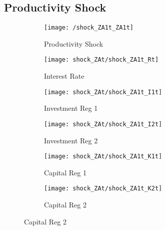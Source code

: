 \documentclass[../thesis.tex]{subfiles}
\begin{document}

\newpage

\subsection{Productivity Shock}

\begin{figure}[h!]
	\centering
	
	
	\begin{subfigure}[b]{0.3\textwidth}
		\centering
		\texttt{[image: /shock\_ZA1t\_ZA1t]}
		\caption{\footnotesize Productivity Shock}
		\label{fig:shock_ZA1t_ZA1t}
	\end{subfigure}
	\hfill
	\begin{subfigure}[b]{0.3\textwidth}
		\centering
		\texttt{[image: shock\_ZAt/shock\_ZA1t\_Rt]}
		\caption{\footnotesize Interest Rate}
		\label{fig:shock_ZA1t_Rt}
	\end{subfigure}
	\hfill
	\begin{subfigure}[b]{0.3\textwidth}
		\centering
		\texttt{[image: shock\_ZAt/shock\_ZA1t\_I1t]}
		\caption{\footnotesize Investment Reg 1}
		\label{fig:shock_ZA1t_I1t}
	\end{subfigure}
	\hfill
	\vspace*{0.5cm}
	
	
	\begin{subfigure}[b]{0.3\textwidth}
		\centering
		\texttt{[image: shock\_ZAt/shock\_ZA1t\_I2t]}
		\caption{\footnotesize Investment Reg 2}
		\label{fig:shock_ZA1t_I2t}
	\end{subfigure}
	\hfill
	\begin{subfigure}[b]{0.3\textwidth}
		\centering
		\texttt{[image: shock\_ZAt/shock\_ZA1t\_K1t]}
		\caption{\footnotesize Capital Reg 1}
		\label{fig:shock_ZA1t_K1t}
	\end{subfigure}
	\hfill
	\begin{subfigure}[b]{0.3\textwidth}
		\centering
		\texttt{[image: shock\_ZAt/shock\_ZA1t\_K2t]}
		\caption{\footnotesize Capital Reg 2}
		\label{fig:shock_ZA1t_K2t}
	\end{subfigure}
	\hfill
	\vspace*{0.5cm}
	

\end{figure}
\end{document}
